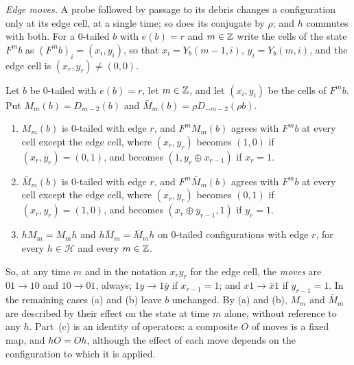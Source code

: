 \emph{Edge moves.} A probe followed by passage to its debris changes a configuration only at its edge cell, at a single time; so does its conjugate by $\rho$; and $h$ commutes with both. For a $0$-tailed $b$ with $e(b)=r$ and $m\in\mathbb{Z}$ write the cells of the state $F^mb$ as $(F^mb)_i=(x_i,y_i)$, so that $x_i=Y_b(m-1,i)$, $y_i=Y_b(m,i)$, and the edge cell is $(x_r,y_r)\ne(0,0)$.

\begin{lemma}\label{cl:lem:edgemove}
Let $b$ be $0$-tailed with $e(b)=r$, let $m\in\mathbb{Z}$, and let $(x_i,y_i)$ be the cells of $F^mb$. Put $M_m(b)=D_{m-2}(b)$ and $\bar M_m(b)=\rho D_{-m-2}(\rho b)$.
\begin{enumerate}
\item[(a)] $M_m(b)$ is $0$-tailed with edge $r$, and $F^mM_m(b)$ agrees with $F^mb$ at every cell except the edge cell, where $(x_r,y_r)$ becomes $(1,0)$ if $(x_r,y_r)=(0,1)$, and becomes $(1,y_r\oplus x_{r-1})$ if $x_r=1$.
\item[(b)] $\bar M_m(b)$ is $0$-tailed with edge $r$, and $F^m\bar M_m(b)$ agrees with $F^mb$ at every cell except the edge cell, where $(x_r,y_r)$ becomes $(0,1)$ if $(x_r,y_r)=(1,0)$, and becomes $(x_r\oplus y_{r-1},1)$ if $y_r=1$.
\item[(c)] $hM_m=M_mh$ and $h\bar M_m=\bar M_mh$ on $0$-tailed configurations with edge $r$, for every $h\in\mathcal H$ and every $m\in\mathbb{Z}$.
\end{enumerate}
\end{lemma}

So, at any time $m$ and in the notation $x_ry_r$ for the edge cell, the \emph{moves} are $01\to10$ and $10\to01$, always; $1y\to1\bar y$ if $x_{r-1}=1$; and $x1\to\bar x1$ if $y_{r-1}=1$. In the remaining cases (a) and (b) leave $b$ unchanged. By (a) and (b), $M_m$ and $\bar M_m$ are described by their effect on the state at time $m$ alone, without reference to any $h$. Part~(c) is an identity of operators: a composite $O$ of moves is a fixed map, and $hO=Oh$, although the effect of each move depends on the configuration to which it is applied.


